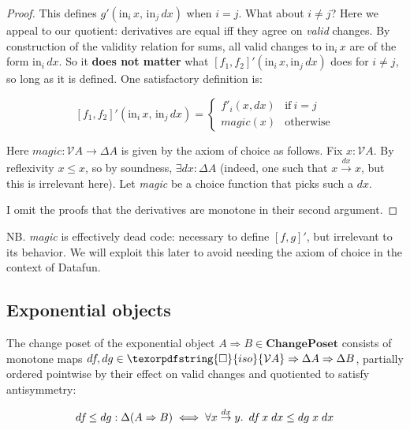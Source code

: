 \documentclass[nomarginums]{rntz}
\newcommand\cat\textbf
\newcommand\strong\textbf
\newcommand\CP{\cat{ChangePoset}}
\newcommand\D\Delta
\newcommand\injc{\mathrm{in}}
\newcommand\inj[1]{\injc_{#1}\,}
\newcommand\iso{\texorpdfstring{\ensuremath{\square}}{iso}}
\newcommand\isof[1]{\iso {#1}}
\newcommand\fname[1]{\textit{#1}}
\newcommand\validarrow{{\to}}
\newcommand\valid[1]{\mathrel{\overset{#1}{\validarrow}}}
\newcommand\vals[1]{#1^v} %
\newcommand\chgs[1]{\D{#1}}
\newcommand\Krof[1]{\left[{#1}\right]}
\renewcommand\vals{\mathcal{V}}
\newcommand\deriv[1]{#1'}
\newcommand\bindsp{~\,}
\newcommand\fa[1]{\forall #1.\bindsp}
\begin{document}
\begin{proof}
  \noindent
  This defines $g'(\inj i x,\, \inj j dx)$ when $i = j$. What about $i \ne j$?
  Here we appeal to our quotient: derivatives are equal iff they agree on
  \emph{valid} changes. By construction of the validity relation for sums, all
  valid changes to $\inj i x$ are of the form $\inj i dx$. So it \strong{does
    not matter} what $\deriv{[f_1,f_2]}(\inj i x, \inj j dx)$ does for $i \ne
  j$, so long as it is defined. One satisfactory definition is:

  \begin{equation*}
    \deriv{\Krof{f_1,f_2}} (\inj{i} x,\, \inj{j} dx)
    = \begin{cases}
      \deriv f_i(x,dx) & \text{if}~ i=j\\
      \fname{magic}(x) & \text{otherwise}
    \end{cases}
  \end{equation*}

  \noindent
  Here $\fname{magic} : \vals A \to \chgs A$ is given by the axiom of choice as
  follows. Fix $x : \vals A$. By reflexivity $x \le x$, so by soundness,
  $\exists dx : \chgs A$ (indeed, one such that $x \valid{dx} x$, but this is
  irrelevant here). Let \fname{magic} be a choice function that picks such a
  $dx$.

  I omit the proofs that the derivatives are monotone in their second argument.
\end{proof}

\noindent
NB. \fname{magic} is effectively dead code: necessary to define $\deriv{[f,g]}$,
but irrelevant to its behavior. We will exploit this later to avoid needing the
axiom of choice in the context of Datafun.


\subsection{Exponential objects}

\newcommand\expO[2]{#1 \Rightarrow #2}
\newcommand\df{d\kern-0.1em f\kern-.1em} %

The change poset of the exponential object $\expO A B \in \CP$ consists of
monotone maps $\df, dg \in \expO{\isof{\vals A}}{\expO{\chgs A}{\chgs B}}$,
partially ordered pointwise by their effect on valid changes and quotiented to
satisfy antisymmetry:

\begin{equation*}
  \df \le dg : \chgs{(\expO A B)}
  \iff \fa{x \valid{dx} y} \df \;x \;dx \le dg \;x \;dx 
\end{equation*}
\end{document}
